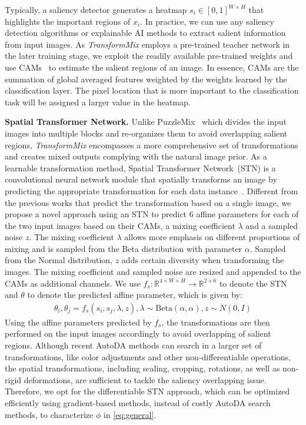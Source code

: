 \documentclass[10pt]{article} %
\newcommand{\TMIX}[0]{\textit{TransformMix }}
\begin{document}
Typically, a saliency detector generates a heatmap $s_i \in [0,1]^{W \times H}$ that highlights the important regions of $x_i$. In practice, we can use any saliency detection algorithms or explainable AI methods to extract salient information from input images. As \TMIX employs a pre-trained teacher network in the later training stage, we exploit the readily available pre-trained weights and use CAMs~\citep{cam} to estimate the salient regions of an image. In essence, CAMs are the summation of global averaged features weighted by the weights learned by the classification layer. The pixel location that is more important to the classification task will be assigned a larger value in the heatmap.

\textbf{Spatial Transformer Network.}
Unlike PuzzleMix~\citep{puzzlemix} which divides the input images into multiple blocks and re-organizes them to avoid overlapping salient regions, \TMIX encompasses a more comprehensive set of transformations and creates mixed outputs complying with the natural image prior. As a learnable transformation method, Spatial Transformer Network~(STN) is a convolutional neural network module that spatially transforms an image by predicting the appropriate transformation for each data instance~\citep{stn}. Different from the previous works that predict the transformation based on a single image, we propose a novel approach using an STN to predict 6 affine parameters for each of the two input images based on their CAMs, a mixing coefficient $\lambda$ and a sampled noise $z$. The mixing coefficient $\lambda$ allows more emphasis on different proportions of mixing and is sampled from the Beta distribution with parameter $\alpha$. Sampled from the Normal distribution, $z$ adds certain diversity when transforming the images. The mixing coefficient and sampled noise are resized and appended to the CAMs as additional channels. We use $f_s: \mathbb{R}^{4 \times W \times H} \rightarrow \mathbb{R}^{2 \times 6}$ to denote the STN and $\theta$ to denote the predicted affine parameter, which is given by:
\begin{equation}
\begin{aligned}
	\theta_i, \theta_j = f_s(s_i, s_j, \lambda, z), \lambda \sim \text{Beta}(\alpha, \alpha), z \sim N(0,I)
\end{aligned}
\end{equation}
Using the affine parameters predicted by $f_s$, the transformations are then performed on the input images accordingly to avoid overlapping of salient regions.  Although recent AutoDA methods can search in a larger set of transformations, like color adjustments and other non-differentiable operations, the spatial transformations, including scaling, cropping, rotations, as well as non-rigid deformations, are sufficient to tackle the saliency overlapping issue. Therefore, we opt for the differentiable STN approach, which can be optimized efficiently using gradient-based methods, instead of costly AutoDA search methods, to characterize $\phi$ in \eqref{eq:general}.
\end{document}
